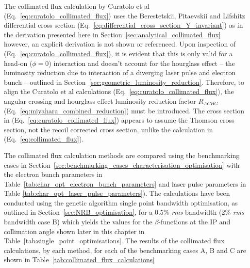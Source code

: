 \documentclass[../main.tex]{subfiles}
\begin{document}
The collimated flux calculation by Curatolo et al \cite{curatolo2017analytical} (Eq.~\ref{eq:curatolo_collimated_flux}) uses the Berestetskii, Pitaevskii and Lifshitz \cite{berestetskii1982quantum} differential cross section (Eq.~\ref{eq:differential_cross_section_Y_invariant}) as in the derivation presented here in Section~\ref{sec:analytical_collimated_flux} however, an explicit derivation is not shown or referenced. Upon inspection of (Eq.~\ref{eq:curatolo_collimated_flux}), it is evident that this is only valid for a head-on ($\phi=0$) interaction and doesn't account for the  hourglass effect \cite{furman1991hourglass,miyahara2008luminosity} -- the luminosity reduction due to interaction of a diverging laser pulse and electron bunch -- outlined in Section~\ref{sec:geometric_luminosity_reduction}. Therefore, to align the Curatolo et al calculations (Eq.~\ref{eq:curatolo_collimated_flux}), the angular crossing and hourglass effect luminosity reduction factor $R_{ACHG}$ \cite{miyahara2008luminosity} (Eq.~\ref{eq:miyahara_combined_reduction}) must be introduced.  The cross section in (Eq.~\ref{eq:curatolo_collimated_flux}) appears to assume the Thomson cross section, not the recoil corrected cross section, unlike the calculation in (Eq.~\ref{eq:collimated_flux}).

The collimated flux calculation methods are compared using the benchmarking cases in Section~\ref{sec:benchmarking_cases_characterisation_optimisation} with the electron bunch parameters in Table~\ref{tab:char_opt_electron_bunch_parameters} and laser pulse parameters in Table \ref{tab:char_opt_laser_pulse_parameters}). The calculations have been conducted using the genetic algorithm single point bandwidth optimisation, as outlined in Section~\ref{sec:NRB_optimisation}, for a 0.5\% \textit{rms} bandwidth (2\% \textit{rms} bandwidth case B) which yields the values for the $\beta$-functions at the IP and collimation angle shown later in this chapter in Table~\ref{tab:single_point_optimisations}. The results of the collimated flux calculations, by each method, for each of the benchmarking cases A, B and C are shown in Table~\ref{tab:collimated_flux_calculations}
\end{document}
